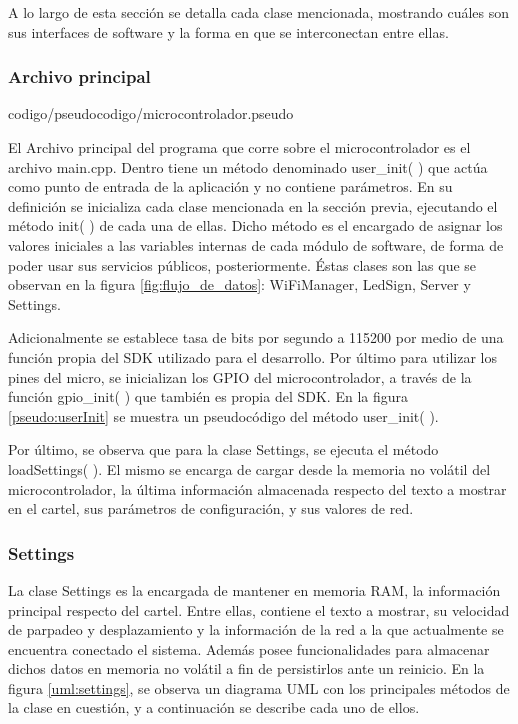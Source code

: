A lo largo de esta sección se detalla cada clase mencionada, mostrando cuáles son sus interfaces de software y la forma en que se interconectan entre ellas.


\subsubsection{Archivo principal} \label{sec:archivo_principal}


{codigo/pseudocodigo/microcontrolador.pseudo}

El Archivo principal del programa que corre sobre el microcontrolador es el archivo main.cpp.
Dentro tiene un método denominado user\_init( ) que actúa como punto de entrada de la aplicación y no contiene parámetros.
En su definición se inicializa cada clase mencionada en la sección previa, ejecutando el método init( ) de cada una de ellas.
Dicho método es el encargado de asignar los valores iniciales a las variables internas de cada módulo de software, de forma de poder usar sus servicios públicos, posteriormente.
Éstas clases son las que se observan en la figura \ref{fig:flujo_de_datos}: WiFiManager, LedSign, Server y Settings.

Adicionalmente se establece tasa de bits por segundo a 115200 por medio de una función propia del SDK utilizado para el desarrollo.
Por último para utilizar los pines del micro, se inicializan los GPIO del microcontrolador, a través de la función gpio\_init( ) que también es propia del SDK.
En la figura \ref{pseudo:userInit} se muestra un pseudocódigo del método user\_init( ).

Por último, se observa que para la clase Settings, se ejecuta el método loadSettings( ).
El mismo se encarga de cargar desde la memoria no volátil del microcontrolador, la última información almacenada respecto del texto a mostrar en el cartel, sus parámetros de configuración, y sus valores de red.


\subsubsection{Settings}

La clase Settings es la encargada de mantener en memoria RAM, la información principal respecto del cartel.
Entre ellas, contiene el texto a mostrar, su velocidad de parpadeo y desplazamiento y la información de la red a la que actualmente se encuentra conectado el sistema.
Además posee funcionalidades para almacenar dichos datos en memoria no volátil a fin de persistirlos ante un reinicio.
En la figura \ref{uml:settings}, se observa un diagrama UML con los principales métodos de la clase en cuestión, y a continuación se describe cada uno de ellos.

